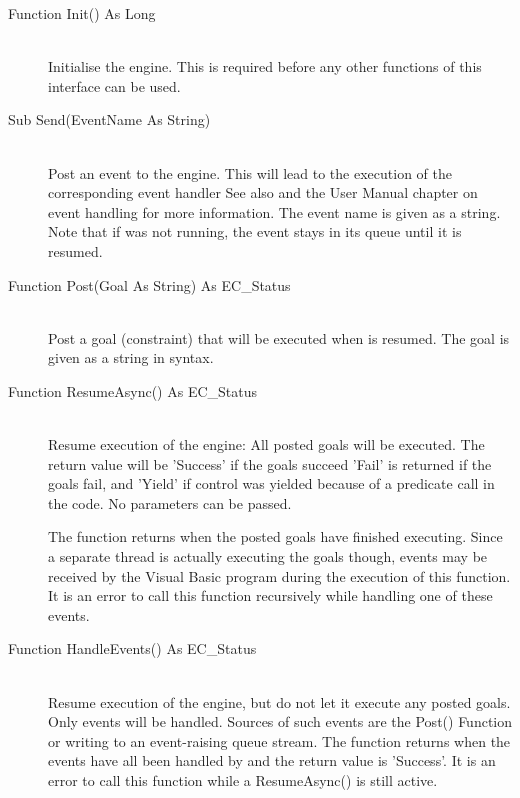 \begin{description}
\item[Function Init() As Long]\ \\
	Initialise the {\eclipse} engine. This is required before any other
	functions of this interface can be used.

\item[Sub Send(EventName As String)]\ \\
	Post an event to the {\eclipse} engine. This will lead to the
	execution of the corresponding event handler
	See also  and the User Manual
	chapter on event handling for more information. The event name
	is given as a string. Note that if {\eclipse} was not running,
	the event stays in its queue until it is resumed.

\item[Function Post(Goal As String) As EC_Status]\ \\
	Post a goal (constraint) that will be executed when \eclipse
	is resumed.  The goal is given as a string in {\eclipse} syntax.

\item[Function ResumeAsync() As EC_Status]\ \\
	Resume execution of the {\eclipse} engine: All posted goals will
	be executed. The return value will be 'Success' if the goals succeed
	'Fail' is returned if the goals fail, and 'Yield' if control was
	yielded because of a
	predicate call in the {\eclipse} code.
	No parameters can be passed.

	The function returns when the posted goals have finished executing.
	Since a separate thread is actually executing the goals though,
	events may be received by the Visual Basic program during the
	execution of this function. It is an error to call this function
	recursively while handling one of these events.

\item[Function HandleEvents() As EC_Status]\ \\
	Resume execution of the {\eclipse} engine, but do not let it execute
	any posted goals. Only {\eclipse} events will be handled. Sources
	of such events are the Post() Function or writing to an event-raising
	{\eclipse} queue stream.
	The function returns when the events have all been handled by
	{\eclipse} and the return value is 'Success'.
	It is an error to call this function while a ResumeAsync()
	is still active.


\end{description}
